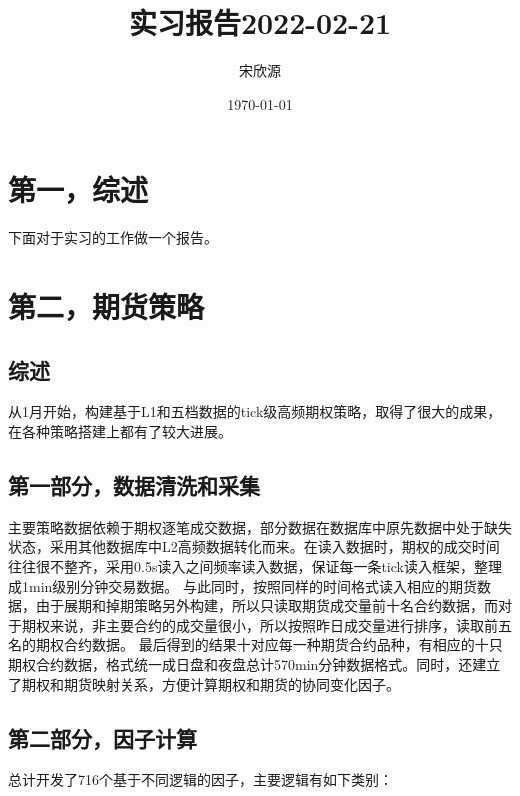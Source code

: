 \documentclass[11pt]{ctexart}
\begin{document}
\title{实习报告2022-02-21}
\author{宋欣源}
\date{\today}

\maketitle %


\section{第一，综述}

下面对于实习的工作做一个报告。

\section{第二，期货策略}
\subsection{综述}

从1月开始，构建基于L1和五档数据的tick级高频期权策略，取得了很大的成果，在各种策略搭建上都有了较大进展。


\subsection{第一部分，数据清洗和采集}
主要策略数据依赖于期权逐笔成交数据，部分数据在数据库中原先数据中处于缺失状态，采用其他数据库中L2高频数据转化而来。在读入数据时，期权的成交时间往往很不整齐，采用0.5s读入之间频率读入数据，保证每一条tick读入框架，整理成1min级别分钟交易数据。
与此同时，按照同样的时间格式读入相应的期货数据，由于展期和掉期策略另外构建，所以只读取期货成交量前十名合约数据，而对于期权来说，非主要合约的成交量很小，所以按照昨日成交量进行排序，读取前五名的期权合约数据。
最后得到的结果十对应每一种期货合约品种，有相应的十只期权合约数据，格式统一成日盘和夜盘总计570min分钟数据格式。同时，还建立了期权和期货映射关系，方便计算期权和期货的协同变化因子。


\subsection{第二部分，因子计算}
总计开发了716个基于不同逻辑的因子，主要逻辑有如下类别：
\end{document}
